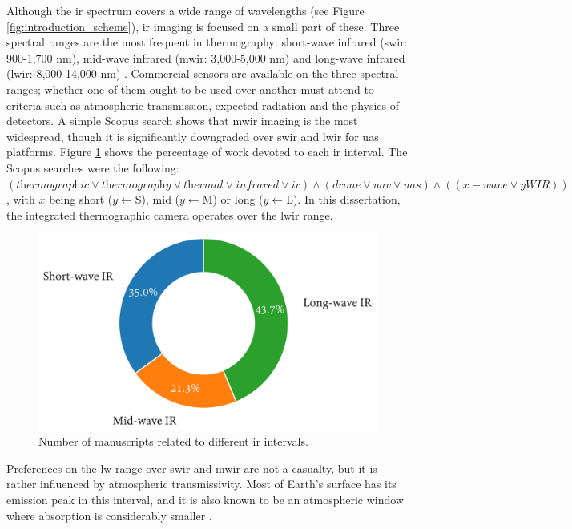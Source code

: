 Although the \acrshort{ir} spectrum covers a wide range of wavelengths (see Figure \ref{fig:introduction_scheme}), \acrshort{ir} imaging is focused on a small part of these. Three spectral ranges are the most frequent in thermography: short-wave infrared (\acrshort{swir}: 900-1,700 \si{\nano\meter}), mid-wave infrared (\acrshort{mwir}: 3,000-5,000 \si{\nano\meter}) and long-wave infrared (\acrshort{lwir}: 8,000-14,000 \si{\nano\meter}) \cite{gade_thermal_2014, vollmer_infrared_2017}. Commercial sensors are available on the three spectral ranges; whether one of them ought to be used over another must attend to criteria such as atmospheric transmission, expected radiation and the physics of detectors. A simple Scopus search shows that \acrshort{mwir} imaging is the most widespread, though it is significantly downgraded over \acrshort{swir} and \acrshort{lwir} for \acrshort{uas} platforms. Figure \ref{fig:infrared_scopus} shows the percentage of work devoted to each \acrshort{ir} interval. The Scopus searches were the following: $(\textit{thermographic} \lor \textit{thermography} \lor \textit{thermal} \lor \textit{infrared} \lor \textit{ir}) \land (\textit{drone} \lor \textit{uav} \lor \textit{uas}) \land ((x-\textit{wave} \lor y\textit{WIR}))$, with $x$ being short ($y \gets $S), mid ($y \gets $M) or long ($y \gets $L). In this dissertation, the integrated thermographic camera operates over the \acrshort{lwir} range. 

\begin{figure}[ht]
	\includegraphics[width=.75\textwidth]{figs/fundamentals/infrared.png}
	\caption{Number of manuscripts related to different \acrshort{ir} intervals.  }
    \label{fig:infrared_scopus}
\end{figure}

Preferences on the \acrshort{lw} range over \acrshort{swir} and \acrshort{mwir} are not a casualty, but it is rather influenced by atmospheric transmissivity. Most of Earth's surface has its emission peak in this interval, and it is also known to be an atmospheric window where absorption is considerably smaller \cite{gonzalez_thermal_2019, quattrochi_thermal_1999}. 

